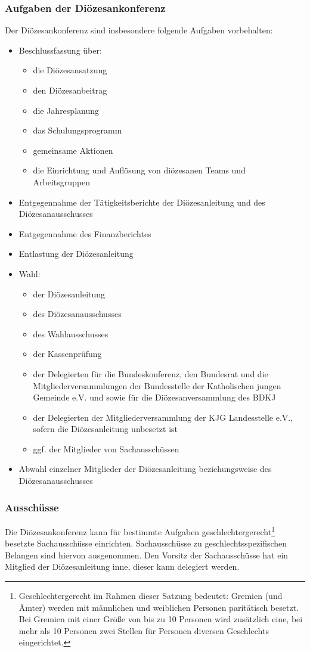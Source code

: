 \documentclass[12pt]{report}
\begin{document}
\begin{flushleft}
\subsubsection{Aufgaben der Diözesankonferenz}
Der Diözesankonferenz sind insbesondere folgende Aufgaben vorbehalten:
\begin{itemize} 
  \item Beschlussfassung über:
    \begin{itemize} 
      \item die Diözesansatzung
      \item den Diözesanbeitrag
      \item die Jahresplanung
      \item das Schulungsprogramm
      \item gemeinsame Aktionen
      \item die Einrichtung und Auflösung von diözesanen Teams und Arbeitsgruppen
    \end{itemize}
  \item Entgegennahme der Tätigkeitsberichte der Diözesanleitung und des Diözesanausschusses
  \item Entgegennahme des Finanzberichtes
  \item Entlastung der Diözesanleitung
  \item Wahl:
    \begin{itemize}
      \item der Diözesanleitung
      \item des Diözesanausschusses
      \item des Wahlausschusses
      \item der Kassenprüfung
      \item der Delegierten für die Bundeskonferenz, den Bundesrat und die 
            Mitgliederversammlungen der Bundesstelle der Katholischen jungen Gemeinde e.V. und sowie für die
            Diözesanversammlung des BDKJ
      \item der Delegierten der Mitgliederversammlung der KJG Landesstelle e.V., sofern die Diözesanleitung
            unbesetzt ist
      \item ggf. der Mitglieder von Sachausschüssen
    \end{itemize}
  \item Abwahl einzelner Mitglieder der Diözesanleitung beziehungsweise des Diözesanausschusses
\end{itemize}
\subsubsection{Ausschüsse}
Die Diözesankonferenz kann für bestimmte Aufgaben geschlechtergerecht\footnote{Geschlechtergerecht im Rahmen dieser Satzung bedeutet: Gremien (und Ämter) werden mit männlichen und
weiblichen Personen paritätisch besetzt. Bei Gremien mit einer Größe von bis zu 10 Personen wird zusätzlich
eine, bei mehr als 10 Personen zwei Stellen für Personen diversen Geschlechts eingerichtet.} besetzte Sachausschüsse einrichten.
Sachausschüsse zu geschlechtsspezifischen Belangen sind hiervon ausgenommen.
Den Vorsitz der Sachausschüsse hat ein Mitglied der Diözesanleitung inne, dieser kann delegiert
werden.


\end{flushleft}
\end{document}
